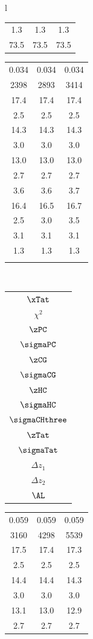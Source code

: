 \begin{table}[htbp]
\begin{tabular}{l}
\begin{tabular}{c c c}
    1.3 & 1.3 & 1.3 \\
    73.5 & 73.5 & 73.5
  \end{tabular}
  \quad
  \begin{tabular}{c c c}
    0.034 & 0.034 & 0.034 \\
    2398 & 2893 & 3414 \\ 
    17.4 & 17.4 & 17.4 \\
    2.5 & 2.5 & 2.5 \\
    14.3 & 14.3 & 14.3 \\
    3.0 & 3.0 & 3.0 \\
    13.0 & 13.0 & 13.0 \\ 
    2.7 & 2.7 & 2.7 \\
    3.6 & 3.6 & 3.7 \\
    16.4 & 16.5 & 16.7 \\
    2.5 & 3.0 & 3.5 \\ 
    3.1 & 3.1 & 3.1 \\
    1.3 & 1.3 & 1.3 \\
    & & 
  \end{tabular}
\\
\hline
  \begin{tabular}{c}
    $\xTat$ \\
    $\chi^2$ \\ 
    $\zPC$ \\
    $\sigmaPC$ \\
    $\zCG$ \\
    $\sigmaCG$ \\
    $\zHC$ \\ 
    $\sigmaHC$ \\
    $\sigmaCHthree$ \\
    $\zTat$ \\
    $\sigmaTat$ \\ 
    $\Delta z_1$ \\
    $\Delta z_2$ \\
    $\AL$
  \end{tabular}
  \quad
  \begin{tabular}{c c c}
    0.059 & 0.059 & 0.059 \\
    3160 & 4298 & 5539 \\ 
    17.5 & 17.4 & 17.3 \\
    2.5 & 2.5 & 2.5 \\
    14.4 & 14.4 & 14.3 \\
    3.0 & 3.0 & 3.0 \\
    13.1 & 13.0 & 12.9 \\ 
    2.7 & 2.7 & 2.7 \\

\end{tabular}
\end{tabular}
\end{table}
